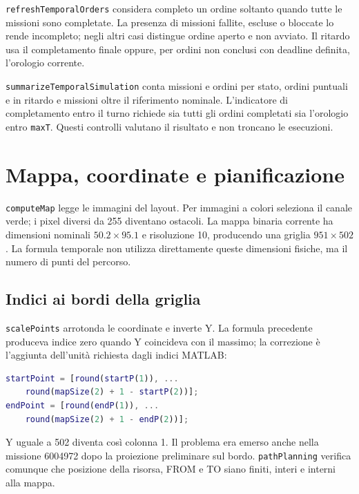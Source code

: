 \texttt{refreshTemporalOrders} considera completo un ordine soltanto
quando tutte le missioni sono completate. La presenza di missioni fallite,
escluse o bloccate lo rende incompleto; negli altri casi distingue ordine
aperto e non avviato. Il ritardo usa il completamento finale oppure, per
ordini non conclusi con deadline definita, l'orologio corrente.

\texttt{summarizeTemporalSimulation} conta missioni e ordini per stato,
ordini puntuali e in ritardo e missioni oltre il riferimento nominale.
L'indicatore di completamento entro il turno richiede sia tutti gli ordini
completati sia l'orologio entro \texttt{maxT}. Questi controlli valutano
il risultato e non troncano le esecuzioni.

\section{Mappa, coordinate e pianificazione}
\label{sec:impl-percorsi}

\texttt{computeMap} legge le immagini del layout. Per immagini a colori
seleziona il canale verde; i pixel diversi da 255 diventano ostacoli.
La mappa binaria corrente ha dimensioni nominali $50.2\times95.1$ e
risoluzione 10, producendo una griglia $951\times502$. La formula temporale
non utilizza direttamente queste dimensioni fisiche, ma il numero di punti
del percorso.

\subsection{Indici ai bordi della griglia}

\texttt{scalePoints} arrotonda le coordinate e inverte Y. La formula
precedente produceva indice zero quando Y coincideva con il massimo;
la correzione è l'aggiunta dell'unità richiesta dagli indici MATLAB:

\begin{lstlisting}[language=Matlab,caption={Conversione corretta delle coordinate operative.},label={lst:impl-indici}]
startPoint = [round(startP(1)), ...
    round(mapSize(2) + 1 - startP(2))];
endPoint = [round(endP(1)), ...
    round(mapSize(2) + 1 - endP(2))];
\end{lstlisting}

Y uguale a 502 diventa così colonna 1. Il problema era emerso anche nella
missione 6004972 dopo la proiezione preliminare sul bordo.
\texttt{pathPlanning} verifica comunque che posizione della risorsa,
FROM e TO siano finiti, interi e interni alla mappa.

